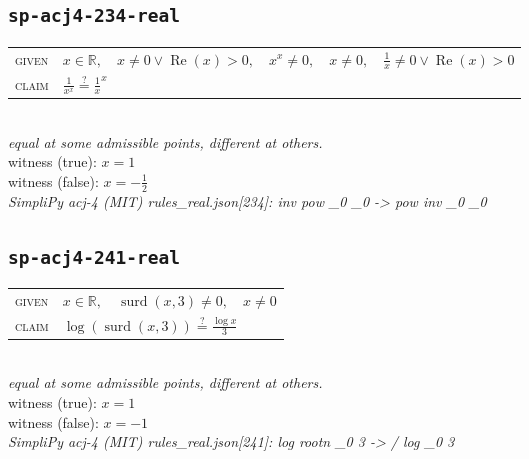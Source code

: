 \documentclass[11pt]{article}
\begin{document}
\subsection*{\texttt{sp-acj4-234-real}}
\begin{tabular}{@{}l@{\quad}l@{}}
\textsc{given} & $x \in \mathbb{R},\quad x \neq 0 \lor \operatorname{Re}\left(x\right) > 0,\quad x^{x} \neq 0,\quad x \neq 0,\quad \frac{1}{x} \neq 0 \lor \operatorname{Re}\left(x\right) > 0$ \\[4pt]
\textsc{claim} & $\displaystyle \frac{1}{x^{x}} \overset{?}{=} \frac{1}{x}^{x}$ \\
\end{tabular}\\[2pt]
{\small\emph{equal at some admissible points, different at others.}}\\
{\footnotesize\color{gray}witness (true): $x = 1$}\\
{\footnotesize\color{gray}witness (false): $x = -\frac{1}{2}$}\\
\emph{SimpliPy acj-4 (MIT) rules\_real.json[234]: inv pow \_0 \_0  ->  pow inv \_0 \_0}\\

\subsection*{\texttt{sp-acj4-241-real}}
\begin{tabular}{@{}l@{\quad}l@{}}
\textsc{given} & $x \in \mathbb{R},\quad \operatorname{surd}\left(x, 3\right) \neq 0,\quad x \neq 0$ \\[4pt]
\textsc{claim} & $\displaystyle \log\left(\operatorname{surd}\left(x, 3\right)\right) \overset{?}{=} \frac{\log x}{3}$ \\
\end{tabular}\\[2pt]
{\small\emph{equal at some admissible points, different at others.}}\\
{\footnotesize\color{gray}witness (true): $x = 1$}\\
{\footnotesize\color{gray}witness (false): $x = -1$}\\
\emph{SimpliPy acj-4 (MIT) rules\_real.json[241]: log rootn \_0 3  ->  / log \_0 3}\\
\end{document}
